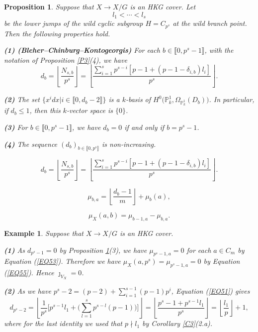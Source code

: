 \documentclass[10pt,a4paper]{amsart}
\newtheorem{proposition}{Proposition}
\newtheorem{ex}{Example}
\begin{document}
\begin{proposition}\label{P6}
Suppose that $X\rightarrow X/G$ is an HKG cover. Let
$$l_1<\cdots<l_s$$
be the lower jumps of the wild cyclic subgroup $H=C_{p^s}$ at the wild branch point. Then the following properties hold.

\medskip
\smallskip
{\bf (1) (Bleher--Chinburg--Kontogeorgis)} For each $b\in\llbracket0,p^s-1\rrbracket$, with the notation of Proposition \ref{P3}(4), we have
\begin{equation}\label{EQ51}
d_b=\left\lfloor \frac{N_{s,b}}{p^s}\right\rfloor=\left\lfloor \frac{\sum_{i=1}^s p^{s-i}[p-1+(p-1-\delta_{i,b})l_i]}{p^s}\right\rfloor.
\end{equation}

{\bf (2)} The set $\{x^idx|i\in\llbracket0,d_b-2\rrbracket\}$ is a $k$-basis of $H^0\bigl(\mathbb P_k^1,\Omega_{\mathbb P_k^1}(D_b)\bigr)$. In particular, if $d_b\le 1$, then this $k$-vector space is $\{0\}$.

\smallskip
{\bf (3)} For $b\in\llbracket0,p^s-1\rrbracket$, we have $d_b=0$ if and only if $b=p^s-1$.

\smallskip
{\bf (4)} The sequence $(d_b)_{b\in\llbracket0,p^s\rrbracket}$ is non-increasing.
\end{proposition}

\begin{equation}
d_b=\left\lfloor \frac{N_{s,b}}{p^s}\right\rfloor=\left\lfloor \frac{\sum_{i=1}^s p^{s-i}[p-1+(p-1-\delta_{i,b})l_i]}{p^s}\right\rfloor.
\end{equation}

\begin{equation}\label{EQ53}
\mu_{b,a}=\left\lfloor\frac{d_b-1}{m}\right\rfloor+\mu_b(a),
\end{equation}

\begin{equation}\label{EQ55}
\mu_X(a,b)=\mu_{b-1,a}-\mu_{b,a}.
\end{equation}

\begin{ex}\normalfont\label{EX8}
Suppose that $X\rightarrow X/G$ is an HKG cover. 

\medskip
{\bf (1)} As $d_{p^s-1}=0$ by Proposition \ref{P6}(3), we have $\mu_{p^s-1,a}=0$ for each $a\in C_m$ by Equation (\ref{EQ53}). Therefore we have $\mu_X(a,p^s)=\mu_{p^s-1,a}=0$ by Equation (\ref{EQ55}). Hence $\jmath_{V_X}=0$.

\smallskip
{\bf (2)} As we have $p^s-2=(p-2)+\sum_{i=1}^{s-1} (p-1)p^i$, Equation (\ref{EQ51}) gives
\[
d_{p^s-2}
=
\left\lfloor \frac{1}{p^s}\Big[p^{s-1}l_1+\Big(\sum_{l=1}^s p^{s-l}(p-1)\Big)\Big]\right\rfloor
=
\left\lfloor \frac{p^s-1+p^{s-1}l_1}{p^s}\right\rfloor
=\left\lfloor \frac{l_1}{p}\right\rfloor+1,
\]
where for the last identity we used that $p\nmid l_1$ by Corollary \ref{C3}(2.a). 
\end{ex}
\end{document}
